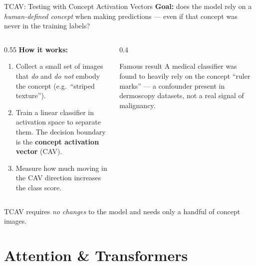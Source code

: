 \documentclass[aspectratio=169]{beamer}
\begin{document}
\begin{frame}{TCAV: Testing with Concept Activation Vectors}
  \textbf{Goal:} does the model rely on a \emph{human-defined concept}
  when making predictions — even if that concept was never in the training labels?

  \vspace{0.6em}
  \begin{columns}[T]
    \begin{column}{0.55\textwidth}
      \textbf{How it works:}
      \begin{enumerate}
        \item Collect a small set of images that \emph{do} and \emph{do not}
              embody the concept (e.g.\ ``striped texture'').
        \item Train a linear classifier in activation space to separate them.
              The decision boundary is the \textbf{concept activation vector} (CAV).
        \item Measure how much moving in the CAV direction increases the
              class score.
      \end{enumerate}
    \end{column}
    \begin{column}{0.4\textwidth}
      \begin{exampleblock}{Famous result}
        A medical classifier was found to heavily rely on the concept
        ``ruler marks'' — a confounder present in dermoscopy datasets,
        not a real signal of malignancy.
      \end{exampleblock}
    \end{column}
  \end{columns}

  \vspace{0.3em}
  \small TCAV requires \emph{no changes} to the model and needs only a handful
  of concept images.
\end{frame}

\section{Attention \& Transformers}
\end{document}
